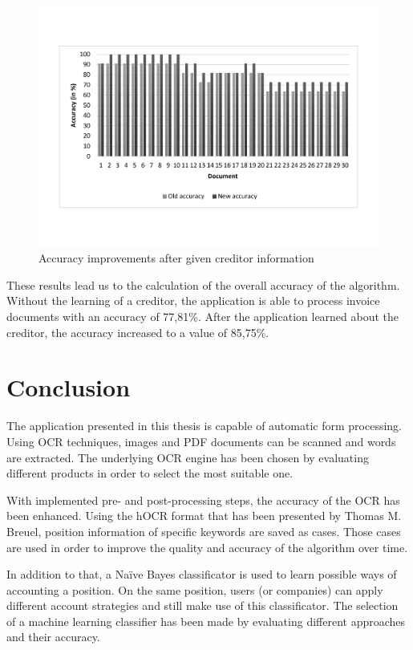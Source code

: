 \begin{figure}[ht!]
\centering
\includegraphics[width=\textwidth,natwidth=297,natheight=210]{Images/Accuracy/Values2.pdf}
\caption{Accuracy improvements after given creditor information \label{accuracyTable2}}
\end{figure}

These results lead us to the calculation of the overall accuracy of the algorithm. Without the learning of a creditor, the application is able to process invoice documents with an accuracy of 77,81\%. After the application learned about the creditor, the accuracy increased to a value of 85,75\%.

\section{Conclusion}
\label{sec6.2}

The application presented in this thesis is capable of automatic form processing. Using OCR techniques, images and PDF documents can be scanned and words are extracted. The underlying OCR engine has been chosen by evaluating different products in order to select the most suitable one.

With implemented pre- and post-processing steps, the accuracy of the OCR has been enhanced. Using the hOCR format that has been presented by Thomas M. Breuel\cite{Breuel07}, position information of specific keywords are saved as cases. Those cases are used in order to improve the quality and accuracy of the algorithm over time. 

In addition to that, a Na{\"i}ve Bayes classificator is used to learn possible ways of accounting a position.
On the same position, users (or companies) can apply different account strategies and still make use of this classificator. The selection of a machine learning classifier has been made by evaluating different approaches and their accuracy. 

